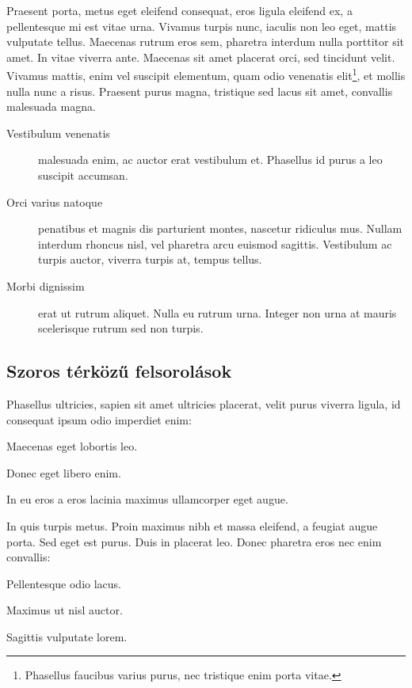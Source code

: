 Praesent porta, metus eget eleifend consequat, eros ligula eleifend ex, a pellentesque mi est vitae urna. Vivamus turpis nunc, iaculis non leo eget, mattis vulputate tellus. Maecenas rutrum eros sem, pharetra interdum nulla porttitor sit amet. In vitae viverra ante. Maecenas sit amet placerat orci, sed tincidunt velit. Vivamus mattis, enim vel suscipit elementum, quam odio venenatis elit\footnote{Phasellus faucibus varius purus, nec tristique enim porta vitae.}, et mollis nulla nunc a risus. Praesent purus magna, tristique sed lacus sit amet, convallis malesuada magna. 

\begin{description}
	\item[Vestibulum venenatis] malesuada enim, ac auctor erat vestibulum et. Phasellus id purus a leo suscipit accumsan.
	\item[Orci varius natoque] penatibus et magnis dis parturient montes, nascetur ridiculus mus. Nullam interdum rhoncus nisl, vel pharetra arcu euismod sagittis. Vestibulum ac turpis auctor, viverra turpis at, tempus tellus.
	\item[Morbi dignissim] erat ut rutrum aliquet. Nulla eu rutrum urna. Integer non urna at mauris scelerisque rutrum sed non turpis.
\end{description}

\subsection{Szoros térközű felsorolások}

Phasellus ultricies, sapien sit amet ultricies placerat, velit purus viverra ligula, id consequat ipsum odio imperdiet enim:
\begin{compactenum}
	\item Maecenas eget lobortis leo.
	\item Donec eget libero enim.
	\item In eu eros a eros lacinia maximus ullamcorper eget augue.
\end{compactenum}

\bigskip

In quis turpis metus. Proin maximus nibh et massa eleifend, a feugiat augue porta. Sed eget est purus. Duis in placerat leo. Donec pharetra eros nec enim convallis:
\begin{compactitem}
	\item Pellentesque odio lacus.
	\item Maximus ut nisl auctor.
	\item Sagittis vulputate lorem.
\end{compactitem}

